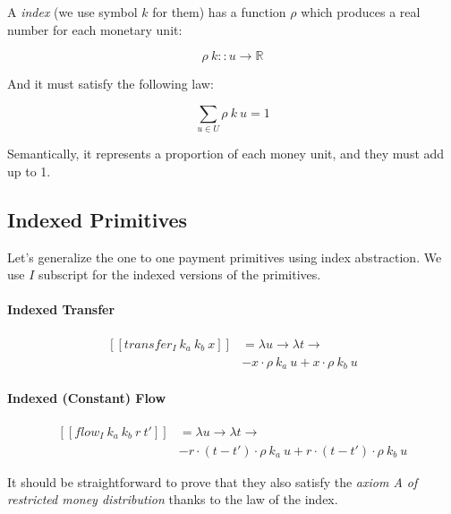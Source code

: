 A \textit{index} (we use symbol $k$ for them) has a function $\rho$ which produces a real number for
each monetary unit:

\begin{equation}
    \rho\ k :: u \rightarrow \mathbb{R}
\end{equation}

And it must satisfy the following law:

\begin{equation}
    \displaystyle \sum_{u \in U} \rho\ k\ u = 1
\end{equation}

Semantically, it represents a proportion of each money unit, and they must add up to 1.

\subsection{Indexed Primitives}

Let's generalize the one to one payment primitives using index abstraction. We use $I$ subscript for
the indexed versions of the primitives.

\paragraph{Indexed Transfer}

\begin{equation}
    \begin{split}
        [\![transfer_I\ k_a\ k_b\ x]\!] &=
        \lambda u \rightarrow \lambda t \rightarrow \\
        &-x \cdot \rho\ k_a\ u + x \cdot \rho\ k_b\ u
    \end{split}
\end{equation}

\paragraph{Indexed (Constant) Flow}

\begin{equation}
    \begin{split}
        [\![flow_I\ k_a\ k_b\ r\ t']\!] &=
        \lambda u \rightarrow \lambda t \rightarrow \\
        &-r \cdot (t - t') \cdot \rho\ k_a\ u + r \cdot (t - t') \cdot \rho\ k_b\ u
    \end{split}
\end{equation}

It should be straightforward to prove that they also satisfy the \textit{axiom A of restricted money
distribution} thanks to the law of the index.


